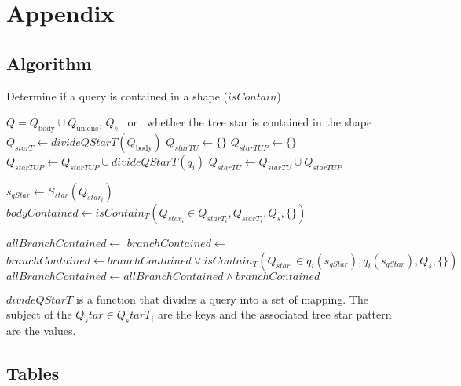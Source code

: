 \section*{Appendix}

\subsection*{Algorithm}

\begin{algorithm}
    \caption{Determine if a query is contained in a shape ($isContain$)}\label{alg:containment}
    \begin{algorithmic}
      \REQUIRE  $Q = Q_{\text{body}} \cup Q_{\text{unions}}$, $Q_s$
      \ENSURE \TRUE\ or \FALSE\ whether the tree star is contained in the shape
         \STATE $Q_{starT} \gets divideQStarT(Q_{\text{body}})$
         \STATE $Q_{starTU} \gets \{\}$
            \STATE $Q_{starTUP} \gets \{\}$
               \STATE $Q_{starTUP} \gets Q_{starTUP} \cup divideQStarT(q_i) $
            \ENDFOR
            \STATE $Q_{starTU} \gets Q_{starTU} \cup Q_{starTUP}$
         \ENDFOR

            \STATE $s_{qStar} \gets S_{star}(Q_{star_i})$
            \STATE $bodyContained \gets isContain_{T}(Q_{star_i} \in Q_{starT_i}, Q_{starT_i}, Q_s, \{\})$
            
            \STATE $allBranchContained \gets $ \TRUE
                  \STATE $branchContained \gets $ \FALSE
                     \STATE $branchContained \gets branchContained \lor isContain_{T}(Q_{star_i} \in q_i(s_{qStar}), q_i(s_{qStar}), Q_s, \{\})$
                  \ENDIF
                  \STATE $allBranchContained \gets allBranchContained \land branchContained$
               \ENDFOR
            \ENDFOR
               \RETURN \TRUE
            \ENDIF
         \ENDFOR
      \RETURN \FALSE
    \end{algorithmic}
 \end{algorithm}

$divideQStarT$ is a function that divides a query into a set of mapping.
The subject of the $Q_star \in Q_starT_i$ are the keys and the associated tree star pattern are the values.

\FloatBarrier

\subsection*{Tables}







\FloatBarrier
